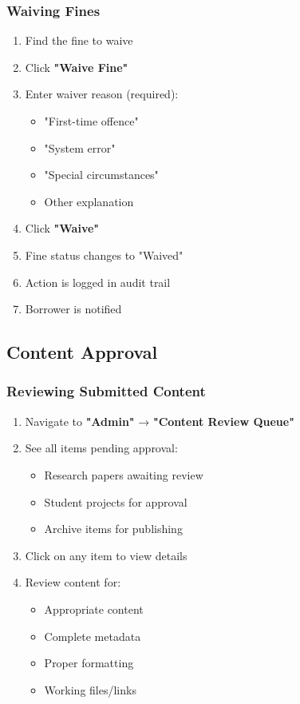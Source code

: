 \documentclass[12pt,a4paper]{article}
\begin{document}
\subsubsection{Waiving Fines}
\begin{enumerate}[leftmargin=*]
    \item Find the fine to waive
    \item Click \textbf{"Waive Fine"}
    \item Enter waiver reason (required):
        \begin{itemize}
            \item "First-time offence"
            \item "System error"
            \item "Special circumstances"
            \item Other explanation
        \end{itemize}
    \item Click \textbf{"Waive"}
    \item Fine status changes to "Waived"
    \item Action is logged in audit trail
    \item Borrower is notified
\end{enumerate}

\subsection{Content Approval}

\subsubsection{Reviewing Submitted Content}
\begin{enumerate}[leftmargin=*]
    \item Navigate to \textbf{"Admin"} → \textbf{"Content Review Queue"}
    \item See all items pending approval:
        \begin{itemize}
            \item Research papers awaiting review
            \item Student projects for approval
            \item Archive items for publishing
        \end{itemize}
    \item Click on any item to view details
    \item Review content for:
        \begin{itemize}
            \item Appropriate content
            \item Complete metadata
            \item Proper formatting
            \item Working files/links
        \end{itemize}
\end{enumerate}
\end{document}
